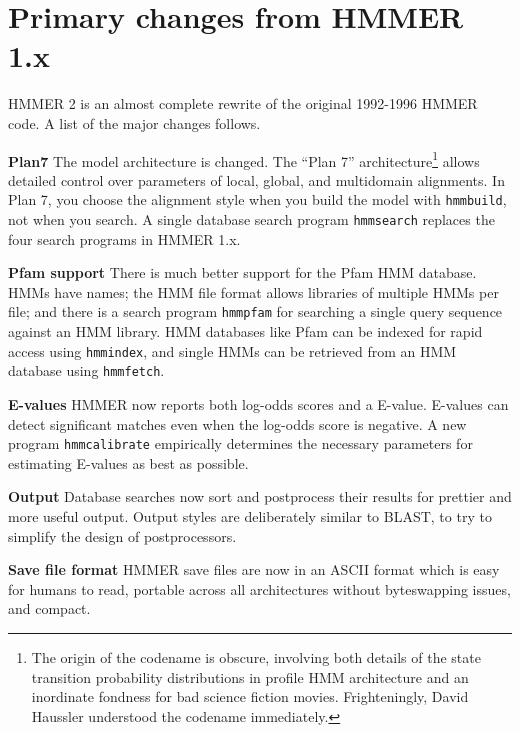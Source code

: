 \documentclass[11pt]{report}
\newenvironment{wideitem}{\begin{list} 
     {}
     { \setlength{\labelwidth}{2in}\setlength{\leftmargin}{1.5in}}}
     {\end{list}}
\newcommand{\prog}[1]{\texttt{#1}}
\begin{document}
\section{Primary changes from HMMER 1.x}

HMMER 2 is an almost complete rewrite of the original 1992-1996 HMMER
code. A list of the major changes follows.

\begin{wideitem}

\item [\textbf{Plan7}] The model architecture is changed. The ``Plan 7''
architecture\footnote{The origin of the codename is obscure, involving
both details of the state transition probability distributions in
profile HMM architecture and an inordinate fondness for bad science
fiction movies. Frighteningly, David Haussler understood the codename
immediately.} allows detailed control over parameters of local,
global, and multidomain alignments. In Plan 7, you choose the
alignment style when you build the model with \prog{hmmbuild}, not
when you search. A single database search program \prog{hmmsearch}
replaces the four search programs in HMMER 1.x.

\item [\textbf{Pfam support}] There is much better support for the Pfam
HMM database. HMMs have names; the HMM file format allows libraries of
multiple HMMs per file; and there is a search program
\prog{hmmpfam}
for searching a single query sequence against an HMM library.
HMM databases like Pfam can be indexed for rapid access using
\prog{hmmindex}, and single HMMs can be retrieved from an HMM
database using \prog{hmmfetch}.

\item [\textbf{E-values}] HMMER now reports both log-odds scores and
a E-value. E-values can detect significant matches even when the
log-odds score is negative. A new program \prog{hmmcalibrate}
empirically determines the necessary parameters for estimating
E-values as best as possible.

\item [\textbf{Output}] Database searches now sort and postprocess their results for
prettier and more useful output. Output styles are deliberately
similar to BLAST, to try to simplify the design of postprocessors.

\item [\textbf{Save file format}] HMMER save files are now in an ASCII format which
  is easy for humans to read, portable across all architectures
  without byteswapping issues, and compact.


\end{wideitem}
\end{document}

